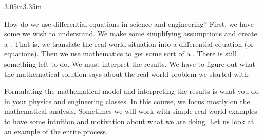 \begin{mywrapfigsimp}{3.05in}{3.35in}
\noindent
{}
\diffypdfversion{\par\vspace*{5pt}}
\end{mywrapfigsimp}
How do we use differential equations in science and engineering?
First, we have some \emph{} we wish
to understand.
We make some simplifying assumptions and create a
\emph{}.
That is, we translate the real-world situation into
a differential equation (or equations).
Then we use mathematics to get some sort of a
\emph{}.
There is still something left to do.  We must interpret the results.
We have to figure out what the mathematical solution says about the real-world
problem we started with.

Formulating the mathematical model and interpreting
the results is what you do in your physics and engineering classes.
In this
course, we focus mostly on the mathematical analysis.
Sometimes we will
work with simple real-world examples
to have some intuition and
motivation about what we are doing.
Let us look at
an example of the entire process.

